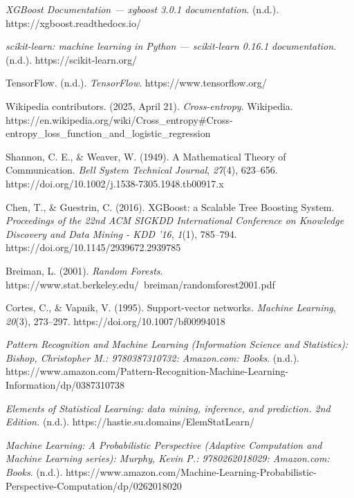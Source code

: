 \documentclass[conference]{IEEEtran}
\begin{document}
    \begin{thebibliography}{00}
        \textit{XGBoost Documentation — xgboost 3.0.1 documentation}.
        (n.d.). https://xgboost.readthedocs.io/

        \textit{scikit-learn: machine learning in Python — scikit-learn 0.16.1 documentation}.
        (n.d.). https://scikit-learn.org/

        TensorFlow.
        (n.d.). \textit{TensorFlow}.
        https://www.tensorflow.org/

        Wikipedia contributors.
        (2025, April 21). \textit{Cross-entropy}.
        Wikipedia.
        https://en.wikipedia.org/wiki/Cross\_entropy\#Cross-entropy\_loss\_function\_and\_logistic\_regression

        Shannon, C. E., \& Weaver, W. (1949).
        A Mathematical Theory of Communication. \textit{Bell System Technical Journal}, \textit{27}(4), 623–656.
        https://doi.org/10.1002/j.1538-7305.1948.tb00917.x

        Chen, T., \& Guestrin, C. (2016).
        XGBoost: a Scalable Tree Boosting System. \textit{Proceedings of the 22nd ACM SIGKDD International Conference on Knowledge Discovery and Data Mining - KDD ’16}, \textit{1}(1), 785–794.
        https://doi.org/10.1145/2939672.2939785

        Breiman, L. (2001). \textit{Random Forests}.
        https://www.stat.berkeley.edu/~breiman/randomforest2001.pdf

        Cortes, C., \& Vapnik, V. (1995).
        Support-vector networks. \textit{Machine Learning}, \textit{20}(3), 273–297.
        https://doi.org/10.1007/bf00994018

        \textit{Pattern Recognition and Machine Learning (Information Science and Statistics): Bishop, Christopher M.: 9780387310732: Amazon.com: Books}.
        (n.d.). https://www.amazon.com/Pattern-Recognition-Machine-Learning-Information/dp/0387310738

        \textit{Elements of Statistical Learning: data mining, inference, and prediction. 2nd Edition.} (n.d.).
        https://hastie.su.domains/ElemStatLearn/

        \textit{Machine Learning: A Probabilistic Perspective (Adaptive Computation and Machine Learning series): Murphy, Kevin P.: 9780262018029: Amazon.com: Books}.
        (n.d.). https://www.amazon.com/Machine-Learning-Probabilistic-Perspective-Computation/dp/0262018020


\end{thebibliography}
\end{document}
